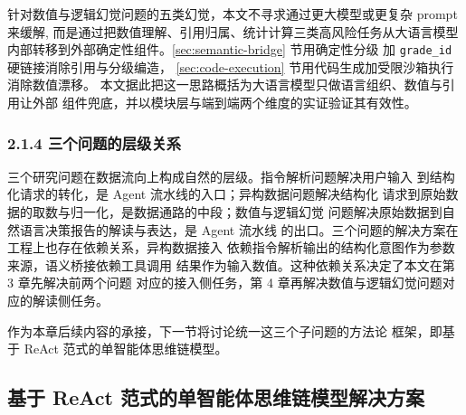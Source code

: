 \documentclass[a4paper]{article}
\theoremstyle{definition}
\theoremstyle{plain}
\theoremstyle{remark}
\newcommand{\reffig}[1]{图 \ref{#1}}
\newcommand{\reftab}[1]{表 \ref{#1}}
\let\oldcite\cite
\renewcommand{\cite}[1]{\textsuperscript{\oldcite{#1}}}
\newcommand{\bk}{\discretionary{}{}{}}
\begin{document}
针对数值与逻辑幻觉问题的五类幻觉，本文不寻求通过更大模型或更复杂
prompt 来缓解,
而是通过把数值理解、引用归属、统计计算三类高风险任务从大语言模型
内部转移到外部确定性组件。\ref{sec:semantic-bridge} 节用确定性分级
加 \texttt{grade\_\bk{}id} 硬链接消除引用与分级编造，
\ref{sec:code-execution} 节用代码生成加受限沙箱执行消除数值漂移。
本文据此把这一思路概括为大语言模型只做语言组织、数值与引用让外部
组件兜底，并以模块层与端到端两个维度的实证验证其有效性。

\subsubsection*{2.1.4 \quad 三个问题的层级关系}

三个研究问题在数据流向上构成自然的层级。指令解析问题解决用户输入
到结构化请求的转化，是 Agent 流水线的入口；异构数据问题解决结构化
请求到原始数据的取数与归一化，是数据通路的中段；数值与逻辑幻觉
问题解决原始数据到自然语言决策报告的解读与表达，是 Agent 流水线
的出口。三个问题的解决方案在工程上也存在依赖关系，异构数据接入
依赖指令解析输出的结构化意图作为参数来源，语义桥接依赖工具调用
结果作为输入数值。这种依赖关系决定了本文在第 3 章先解决前两个问题
对应的接入侧任务，第 4 章再解决数值与逻辑幻觉问题对应的解读侧任务。

作为本章后续内容的承接，下一节将讨论统一这三个子问题的方法论
框架，即基于 ReAct 范式的单智能体思维链模型。




\subsection{基于 ReAct 范式的单智能体思维链模型解决方案}
\label{sec:react-paradigm}
\end{document}
